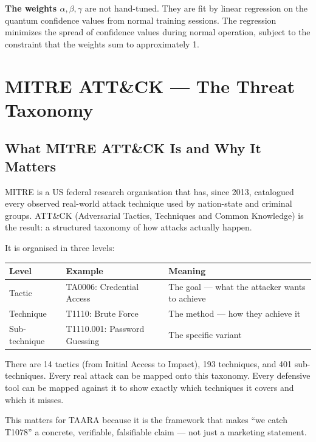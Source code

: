 \documentclass[11pt,a4paper]{article}
\begin{document}
\textbf{The weights $\alpha, \beta, \gamma$} are not hand-tuned. They are fit by linear regression on the quantum confidence values from normal training sessions. The regression minimizes the spread of confidence values during normal operation, subject to the constraint that the weights sum to approximately 1.

\section{MITRE ATT\&CK — The Threat Taxonomy}

\subsection{What MITRE ATT\&CK Is and Why It Matters}

MITRE is a US federal research organisation that has, since 2013, catalogued every observed real-world attack technique used by nation-state and criminal groups. ATT\&CK (Adversarial Tactics, Techniques and Common Knowledge) is the result: a structured taxonomy of how attacks actually happen.

It is organised in three levels:

\begin{table}[H]
\centering
\begin{tabular}{@{}lll@{}}
\toprule
Level & Example & Meaning \\
\midrule
Tactic & TA0006: Credential Access & The goal — what the attacker wants to achieve \\
Technique & T1110: Brute Force & The method — how they achieve it \\
Sub-technique & T1110.001: Password Guessing & The specific variant \\
\bottomrule
\end{tabular}
\end{table}

There are 14 tactics (from Initial Access to Impact), 193 techniques, and 401 sub-techniques. Every real attack can be mapped onto this taxonomy. Every defensive tool can be mapped against it to show exactly which techniques it covers and which it misses.

This matters for TAARA because it is the framework that makes ``we catch T1078'' a concrete, verifiable, falsifiable claim — not just a marketing statement.
\end{document}
